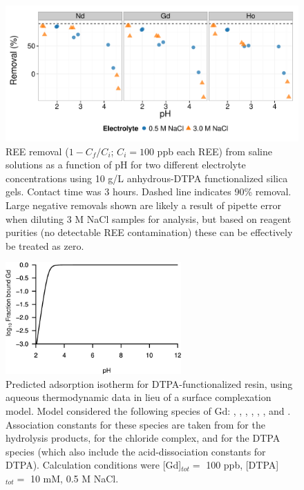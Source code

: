 \begin{figure}[htbp]
\begin{center}
\includegraphics[width = \textwidth]{proposal_figures/ionic-strength-effects_2015-10-13.pdf}
\caption{REE removal ($1 - C_f/C_i$; $C_i = 100$ ppb each REE) from saline solutions as a function of pH for two different electrolyte concentrations using 10 g/L anhydrous-DTPA functionalized silica gels.
Contact time was 3 hours.
Dashed line indicates 90\% removal.
Large negative removals shown are likely a result of pipette error when diluting 3 M NaCl samples for analysis, but based on reagent purities (no detectable REE contamination) these can be effectively be treated as zero.}\label{fig:ads-edge-ionic-strength}
\end{center}
\end{figure}

\begin{figure}[htbp]
\begin{center}
\includegraphics[width = 0.6\textwidth]{proposal_figures/DTPA-binding-model.pdf}
\caption{Predicted adsorption isotherm for DTPA-functionalized resin, using aqueous thermodynamic data in lieu of a surface complexation model.
Model considered the following species of Gd: , , , , , , and .
Association constants for these species are taken from \citet{Lee_GCA_1992} for the hydrolysis products, \citet{Millero_GCA_1992} for the chloride complex, and \citet{Grimes_JSC_2014} for the DTPA species (which also include the acid-dissociation constants for DTPA).
Calculation conditions were [Gd]$_{tot}=$ 100 ppb, [DTPA]$_{tot}=$ 10 mM, 0.5 M NaCl.}\label{fig:DTPA-model}
\end{center}
\end{figure}


